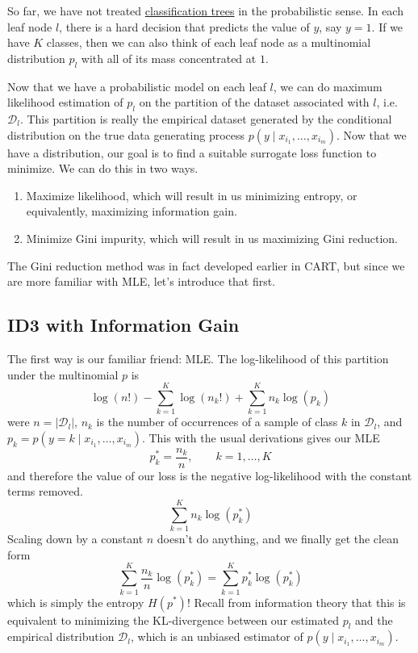   So far, we have not treated \hyperref[def:classification-trees]{classification trees} in the probabilistic sense. In each leaf node $l$, there is a hard decision that predicts the value of $y$, say $y = 1$. If we have $K$ classes, then we can also think of each leaf node as a multinomial distribution $p_l$ with all of its mass concentrated at $1$. 

  Now that we have a probabilistic model on each leaf $l$, we can do maximum likelihood estimation of $p_l$ on the partition of the dataset associated with $l$, i.e. $\mathcal{D}_l$. This partition is really the empirical dataset generated by the conditional distribution on the true data generating process $p(y \mid x_{i_1}, \ldots, x_{i_m})$. Now that we have a distribution, our goal is to find a suitable surrogate loss function to minimize. We can do this in two ways. 
  \begin{enumerate}
    \item Maximize likelihood, which will result in us minimizing entropy, or equivalently, maximizing information gain. 
    \item Minimize Gini impurity, which will result in us maximizing Gini reduction. 
  \end{enumerate}
  The Gini reduction method was in fact developed earlier in CART, but since we are more familiar with MLE, let's introduce that first. 

\subsection{ID3 with Information Gain}

  The first way is our familiar friend: MLE. The log-likelihood of this partition under the multinomial $p$ is 
  \begin{equation}
    \log(n!) - \sum_{k=1}^K \log(n_k !) + \sum_{k=1}^K n_k \log(p_k)
  \end{equation}
  were $n = |\mathcal{D}_l|$, $n_k$ is the number of occurrences of a sample of class $k$ in $\mathcal{D}_l$, and $p_k = p(y = k \mid x_{i_1}, \ldots, x_{i_m})$. This with the usual derivations gives our MLE 
  \begin{equation}
    p_k^\ast = \frac{n_k}{n}, \qquad k = 1, \ldots, K
  \end{equation}
  and therefore the value of our loss is the negative log-likelihood with the constant terms removed. 
  \begin{equation}
    \sum_{k=1}^K n_k \log(p_k^\ast)
  \end{equation}
  Scaling down by a constant $n$ doesn't do anything, and we finally get the clean form 
  \begin{equation}
    \sum_{k=1}^K \frac{n_k}{n} \log(p_k^\ast) = \sum_{k=1}^K p_k^\ast \log(p_k^\ast)
  \end{equation}
  which is simply the entropy $H(p^\ast)$! Recall from information theory that this is equivalent to minimizing the KL-divergence between our estimated $p_l$ and the empirical distribution $\mathcal{D}_l$, which is an unbiased estimator of $p(y \mid x_{i_1}, \ldots, x_{i_m})$. 

